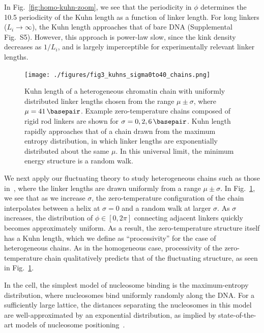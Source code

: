 \documentclass[%
 reprint,
superscriptaddress,
showpacs,preprintnumbers,
 amsmath,amssymb,
 aps,
 prl,
]{revtex4-1}
\begin{document}
In Fig.~\ref{fig:homo-kuhn-zoom}, we see that the periodicity in $\phi$ determines the \SI{10.5}{\basepair} periodicity of the Kuhn
    length as a function of linker length.
For long linkers ($L_i\to\infty$), the Kuhn length approaches that of
    bare DNA (Supplemental Fig.~S5).
However, this approach is power-law slow, since the kink density decreases as $1/L_i$, and is largely imperceptible for experimentally relevant linker lengths.

\begin{figure}
    \centering
    \texttt{[image: ./figures/fig3\_kuhns\_sigma0to40\_chains.png]}
    \caption{Kuhn length of a heterogeneous chromatin chain with uniformly
    distributed linker lengths chosen from the range $\mu \pm \sigma$, where
    $\mu = \SI{41}{\basepair}$. Example zero-temperature chains composed of rigid
    rod linkers are shown for $\sigma = 0, 2, \SI{6}{\basepair}$. Kuhn length
    rapidly approaches that of a chain drawn from the maximum entropy
    distribution, in which linker lengths are exponentially distributed about
    the same $\mu$. In this universal limit, the minimum energy structure is a
    random walk.}\label{fig:hetero-geom}
\end{figure}

We next apply our fluctuating theory to study heterogeneous chains such as those
    in~\cite{woodcock1993}, where the linker lengths are drawn uniformly from a
    range $\mu \pm \sigma$.
In Fig.~\ref{fig:hetero-geom}, we see that as we increase $\sigma$, the
    zero-temperature configuration of the chain interpolates between a helix at
    $\sigma = 0$ and a random walk at larger $\sigma$.
As $\sigma$ increases, the distribution of $\phi \in [0, 2\pi]$ connecting
    adjacent linkers quickly becomes approximately uniform.
As a result, the zero-temperature structure itself has a Kuhn length, which we
    define as ``processivity'' for the case of heterogeneous chains.
As in the homogeneous case, processivity of the zero-temperature chain
    qualitatively predicts that of the fluctuating structure, as seen in
    Fig.~\ref{fig:hetero-geom}.


In the cell, the simplest model of nucleosome binding is the maximum-entropy
    distribution, where nucleosomes bind uniformly randomly along the DNA\@.
For a sufficiently large lattice, the distances separating the nucleosomes in
    this model are well-approximated by an exponential distribution, as implied
    by state-of-the-art models of nucleosome positioning~\cite{beshnova2014}.
\end{document}

